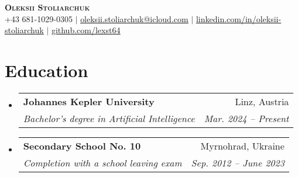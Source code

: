 \documentclass[letterpaper,11pt]{article}
\makeatletter
\newcommand{\resumeItem}[1]{
  \item\small{
    {#1 \vspace{-2pt}}
  }
}
\newcommand{\resumeSubheading}[4]{
  \vspace{-2pt}\item
    \begin{tabular*}{0.97\textwidth}[t]{l@{\extracolsep{\fill}}r}
      \textbf{#1} & #2 \\
      \textit{\small#3} & \textit{\small #4} \\
    \end{tabular*}\vspace{-7pt}
}
\newcommand{\resumeSubHeadingListStart}{\begin{itemize}[leftmargin=0.15in, label={}]}
\newcommand{\resumeSubHeadingListEnd}{\end{itemize}}
\newcommand{\resumeItemListStart}{\begin{itemize}}
\newcommand{\resumeItemListEnd}{\end{itemize}\vspace{-5pt}}
\makeatother
\begin{document}

\begin{center}
    \textbf{\Huge \scshape Oleksii Stoliarchuk} \\ \vspace{1pt}
    \small +43 681-1029-0305 $|$ \href{mailto:oleksii.stoliarchuk@icloud.com}{\underline{oleksii.stoliarchuk@icloud.com}} $|$ 
    \href{https://www.linkedin.com/in/oleksii-stoliarchuk}{\underline{linkedin.com/in/oleksii-stoliarchuk}} $|$
    \href{https://github.com/lexst64}{\underline{github.com/lexst64}}
\end{center}


\section{Education}
  \resumeSubHeadingListStart
    \resumeSubheading
      {Johannes Kepler University}{Linz, Austria}
      {Bachelor's degree in Artificial Intelligence}{Mar. 2024 -- Present}
    \resumeSubheading
      {Secondary School No. 10}{Myrnohrad, Ukraine}
      {Completion with a school leaving exam}{Sep. 2012 -- June 2023}
  \resumeSubHeadingListEnd



      
\end{document}
